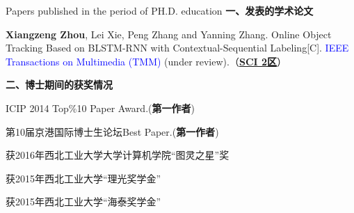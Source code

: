 
{} {Papers published in the period of PH.D. education}
\setlength{\parindent}{0em}
\textbf{一、发表的学术论文}
\begin{publist}
  \item {\bf Xiangzeng Zhou}, Lei Xie, Peng Zhang and Yanning Zhang. Online Object Tracking Based on BLSTM-RNN with Contextual-Sequential Labeling[C]. \textcolor{blue}{IEEE Transactions on Multimedia (TMM)} (under review).（\underline{\bf SCI 2区}）
\end{publist}
\vspace{1cm}

\textbf{二、博士期间的获奖情况}
\begin{publist}
 \item ICIP 2014 Top\%10 Paper Award.({\bf 第一作者})
 \item 第10届京港国际博士生论坛Best Paper.({\bf 第一作者})
 \item 获2016年西北工业大学大学计算机学院“图灵之星”奖
 \item 获2015年西北工业大学“理光奖学金”
 \item 获2015年西北工业大学“海泰奖学金”
\end{publist}

